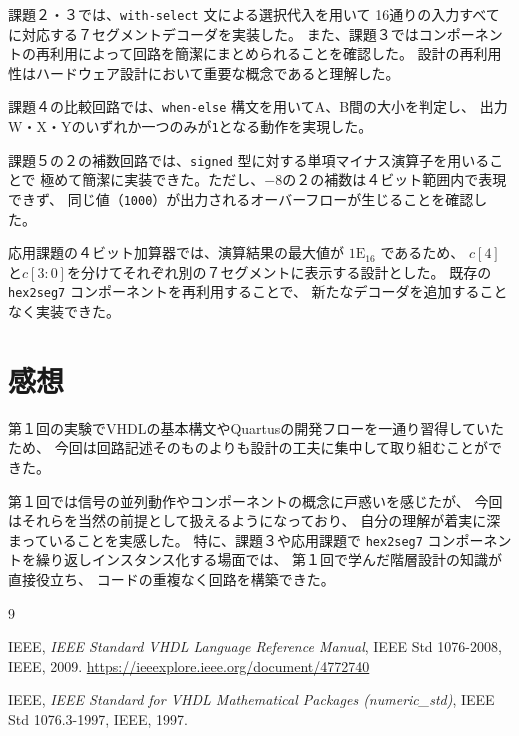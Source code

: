 \documentclass[12pt,a4paper]{ltjsarticle}
\begin{document}
課題２・３では、\texttt{with-select} 文による選択代入を用いて
16通りの入力すべてに対応する７セグメントデコーダを実装した。
また、課題３ではコンポーネントの再利用によって回路を簡潔にまとめられることを確認した。
設計の再利用性はハードウェア設計において重要な概念であると理解した。

課題４の比較回路では、\texttt{when-else} 構文を用いてA、B間の大小を判定し、
出力W・X・Yのいずれか一つのみが\texttt{1}となる動作を実現した。

課題５の２の補数回路では、\texttt{signed} 型に対する単項マイナス演算子を用いることで
極めて簡潔に実装できた。ただし、$-8$の２の補数は４ビット範囲内で表現できず、
同じ値（\texttt{1000}）が出力されるオーバーフローが生じることを確認した。

応用課題の４ビット加算器では、演算結果の最大値が $\mathrm{1E}_{16}$ であるため、
$c[4]$と$c[3:0]$を分けてそれぞれ別の７セグメントに表示する設計とした。
既存の \texttt{hex2seg7} コンポーネントを再利用することで、
新たなデコーダを追加することなく実装できた。

\section{感想}

第１回の実験でVHDLの基本構文やQuartusの開発フローを一通り習得していたため、
今回は回路記述そのものよりも設計の工夫に集中して取り組むことができた。

第１回では信号の並列動作やコンポーネントの概念に戸惑いを感じたが、
今回はそれらを当然の前提として扱えるようになっており、
自分の理解が着実に深まっていることを実感した。
特に、課題３や応用課題で \texttt{hex2seg7} コンポーネントを繰り返しインスタンス化する場面では、
第１回で学んだ階層設計の知識が直接役立ち、
コードの重複なく回路を構築できた。

\begin{thebibliography}{9}

IEEE,
\textit{IEEE Standard VHDL Language Reference Manual},
IEEE Std 1076-2008, IEEE, 2009.
\url{https://ieeexplore.ieee.org/document/4772740}

IEEE,
\textit{IEEE Standard for VHDL Mathematical Packages (numeric\_std)},
IEEE Std 1076.3-1997, IEEE, 1997.

\end{thebibliography}
\end{document}
